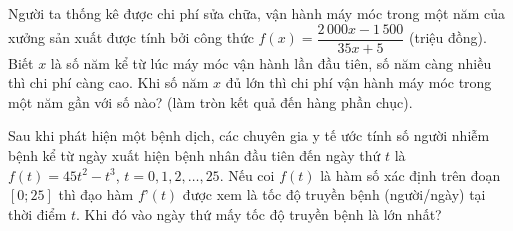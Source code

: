 \begin{bt}%

	Người ta thống kê được chi phí sửa chữa, vận hành máy móc trong một năm của xưởng sản xuất được tính bởi công thức $f(x)=\dfrac{2\,000x-1\,500}{35x+5}$ (triệu đồng). Biết $x$ là số năm kể từ lúc máy móc vận hành lần đầu tiên, số năm càng nhiều thì chi phí càng cao. Khi số năm $x$ đủ lớn thì chi phí vận hành máy móc trong một năm gần với số nào? (làm tròn kết quả đến hàng phần chục).
	
	
\end{bt}

\begin{bt}%

	Sau khi phát hiện một bệnh dịch, các chuyên gia y tế ước tính số người nhiễm bệnh kể từ ngày xuất hiện bệnh nhân đầu tiên đến ngày thứ $t$ là $f(t)=45t^2-t^3$, $t=0,1,2,\ldots,25$. Nếu coi $f(t)$ là hàm số xác định trên đoạn $[0;25]$ thì đạo hàm $f’(t)$ được xem là tốc độ truyền bệnh (người/ngày) tại thời điểm $t$. Khi đó vào ngày thứ mấy tốc độ truyền bệnh là lớn nhất?
\end{bt}

